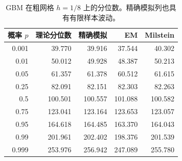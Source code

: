 \begin{table}[htbp]\centering\small
\caption{GBM 在粗网格 $h=1/8$ 上的分位数。精确模拟列也具有有限样本波动。}\label{tab:results-quantiles}
\begin{tabular}{rrrrr}\toprule
概率 $p$ & 理论分位数 & 精确模拟 & EM & Milstein\\\midrule
0.001 & 39.770 & 39.916 & 37.544 & 40.302\\
0.01 & 50.012 & 49.928 & 48.387 & 50.213\\
0.05 & 61.357 & 61.378 & 60.512 & 61.615\\
0.25 & 82.091 & 82.151 & 82.303 & 82.263\\
0.5 & 100.501 & 100.557 & 101.088 & 100.582\\
0.75 & 123.041 & 123.164 & 123.653 & 123.057\\
0.95 & 164.618 & 164.485 & 163.370 & 164.043\\
0.99 & 201.961 & 202.402 & 198.376 & 201.539\\
0.999 & 253.976 & 256.942 & 247.089 & 255.780\\
\bottomrule
\end{tabular}
\end{table}
